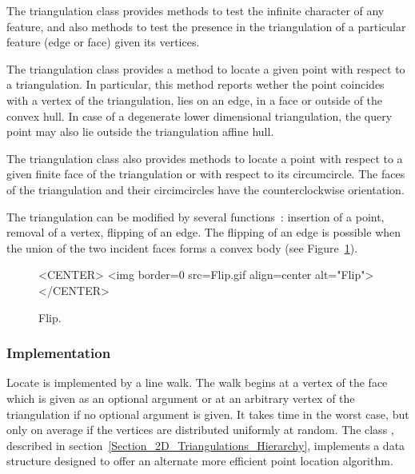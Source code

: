 The triangulation class provides methods to test
the infinite character of any feature,
and also methods to test the presence in the triangulation
of a particular feature (edge or face) given its vertices.

The triangulation class  provides a method to locate
a given point with respect to a triangulation.
In particular, this method reports wether the point
coincides with a vertex of the triangulation, lies on an edge,
in a face or outside of the convex hull. In case of a degenerate 
lower dimensional triangulation, the query point may also lie
outside the triangulation affine hull.

The triangulation class also provides
methods to locate a point with respect to
a given  finite face of the triangulation or with respect to its
circumcircle.
The faces of the triangulation and their circimcircles 
have the  counterclockwise orientation.

The triangulation can be modified by several functions~:
insertion of a point, removal of a vertex,
flipping  of an edge. The flipping of an edge
is possible when the union of the two incident faces
forms  a convex body (see Figure~\ref{I1_fig_flip_bis}). 

\begin{figure}
\begin{ccTexOnly}
\begin{center} %

\end{center}
\end{ccTexOnly} 
\caption{Flip. \label{I1_fig_flip_bis}}

\begin{ccHtmlOnly}
<CENTER>
<img border=0 src=Flip.gif align=center alt="Flip">
</CENTER>
\end{ccHtmlOnly} 
\end{figure}


\subsubsection{Implementation}

Locate is implemented by a line walk. The walk
begins  at  a vertex of the face which
is given
as an optional argument  or at an arbitrary vertex of the triangulation
 if no optional argument is given. It takes
time  in the worst case, but only 
on average if the vertices are distributed uniformly at random.
The class ,
described in section~\ref{Section_2D_Triangulations_Hierarchy}, 
implements a data structure  designed to
offer an alternate  more efficient point location algorithm.

